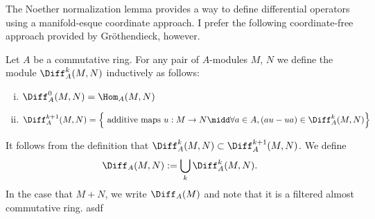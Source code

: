\begin{rmk}\label{rmk:Noeth-Norm-gives-coord-def-of-diff-op}
	The Noether normalization lemma provides a way to define differential operators using a manifold-esque coordinate approach. I prefer the following coordinate-free approach provided by Gr\"othendieck, however.
\end{rmk}
\begin{defn}\label{defn:diff-ops}
	Let $A$ be a commutative ring. For any pair of $A$-modules $M$, $N$ we define the module $\Diff_A^{k}(M,N)$ inductively as follows:
	\begin{enumerate}[(i)]
		\item $\Diff_A^{0}(M,N) = \Hom_A(M,N)$
		\item $\Diff_A^{k+1}(M,N) = \left\{\text{ additive maps } u:M\to N \midd \forall a \in A, (a u - u a) \in \Diff^{k}_A(M,N)\right\}$
	\end{enumerate}
	It follows from the definition that $\Diff_{A}^{k}(M,N) \subset \Diff_A^{k+1}(M,N)$. We define
	\begin{align*}
		\Diff_A(M,N) := \bigcup_{k} \Diff_A^k(M,N).
	\end{align*}
	In the case that $M + N$, we write $\Diff_A(M)$ and note that it is a filtered almost commutative ring. asdf
\end{defn}











